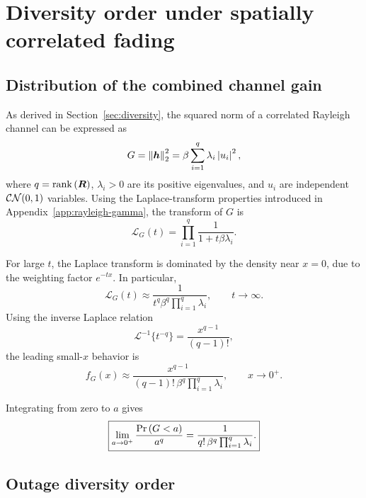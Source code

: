 \section{Diversity order under spatially correlated fading}
\label{app:correlated-diversity}

\subsection{Distribution of the combined channel gain}

As derived in Section~\ref{sec:diversity}, the squared norm of a correlated Rayleigh channel can be expressed as
\begin{equation*}
	G=\left\|\bm{h}\right\|_2^2
	=\beta\sum_{i=1}^{q}\lambda_i\left|u_i\right|^2,
\end{equation*}
where $q=\operatorname{rank}\left(\bm{R}\right)$, $\lambda_i>0$ are its positive eigenvalues, and $u_i$ are independent $\mathcal{CN}(0,1)$ variables.
%
Using the Laplace-transform properties introduced in Appendix~\ref{app:rayleigh-gamma}, the transform of $G$ is
\begin{equation}\label{eq:app-corr-laplace}
	\mathcal{L}_G(t)
	=\prod_{i=1}^{q}\frac{1}{1+t\beta\lambda_i}.
\end{equation}


For large $t$, the Laplace transform is dominated
by the density near $x=0$, due to the weighting
factor $e^{-tx}$. In particular,
\begin{equation*}
	\mathcal{L}_G(t)
	\approx
	\frac{1}{
		t^q\beta^q\prod_{i=1}^{q}\lambda_i
	},
	\qquad t\to\infty.
\end{equation*}
Using the inverse Laplace relation
\begin{equation*}
	\mathcal{L}^{-1}\{t^{-q}\}
	=\frac{x^{q-1}}{(q-1)!},
\end{equation*}
the leading small-$x$ behavior is
\begin{equation*}
	f_G(x)\approx
	\frac{x^{q-1}}{
		(q-1)!\,\beta^q
		\prod_{i=1}^{q}\lambda_i
	},
	\qquad x\to0^+.
\end{equation*}


Integrating from zero to $a$ gives
\begin{equation}\label{eq:app-corr-tail}
	\boxed{
		\lim_{a\to0^+}
		\frac{\Pr\left(G<a\right)}{a^q}
		=
		\frac{1}{q!\,\beta^q\prod_{i=1}^{q}\lambda_i}.
	}
\end{equation}

\subsection{Outage diversity order}


